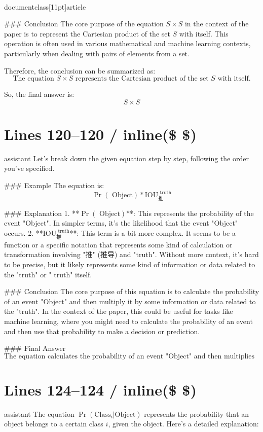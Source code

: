 \\documentclass[11pt]{article}
\begin{document}
### Conclusion
The core purpose of the equation \( S \times S \) in the context of the paper is to represent the Cartesian product of the set \( S \) with itself. This operation is often used in various mathematical and machine learning contexts, particularly when dealing with pairs of elements from a set.

Therefore, the conclusion can be summarized as:
\[ \text{The equation } S \times S \text{ represents the Cartesian product of the set } S \text{ with itself.} \]

So, the final answer is:
\[ \boxed{S \times S} \]


\section*{Lines 120–120 / inline(\$ \$) }
assistant
Let's break down the given equation step by step, following the order you've specified.

### Example
The equation is:
\[
\Pr(\textrm{ Object}) * \textrm{IOU}_{\textrm{推}}^{\textrm{ truth}}
\]

### Explanation
1. **\(\Pr(\textrm{ Object})\)**: This represents the probability of the event "Object". In simpler terms, it's the likelihood that the event "Object" occurs.
2. **\(\textrm{IOU}_{\textrm{推}}^{\textrm{ truth}}\)**: This term is a bit more complex. It seems to be a function or a specific notation that represents some kind of calculation or transformation involving "推" (推导) and "truth". Without more context, it's hard to be precise, but it likely represents some kind of information or data related to the "truth" or " truth" itself.

### Conclusion
The core purpose of this equation is to calculate the probability of an event "Object" and then multiply it by some information or data related to the "truth". In the context of the paper, this could be useful for tasks like machine learning, where you might need to calculate the probability of an event and then use that probability to make a decision or prediction.

### Final Answer
\[
\boxed{\text{The equation calculates the probability of an event "Object" and then multiplies it by some information or data related to the "truth".}}
\]


\section*{Lines 124–124 / inline(\$ \$) }
assistant
The equation \(\Pr(\textrm{Class}_i | \textrm{Object})\) represents the probability that an object belongs to a certain class \(i\), given the object. Here's a detailed explanation:
\end{document}
